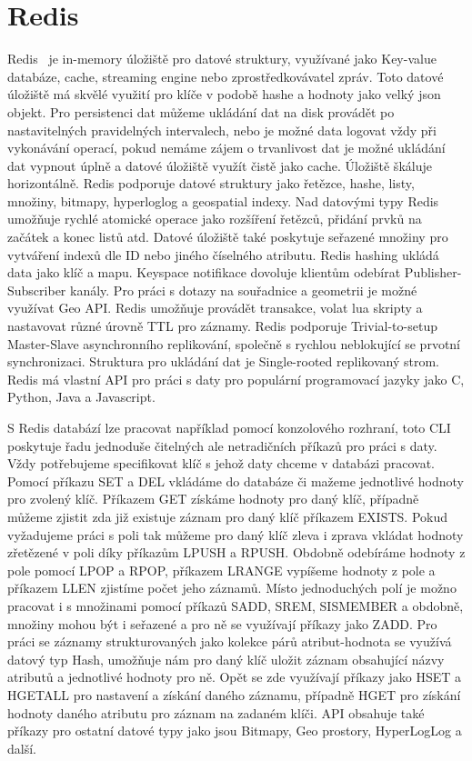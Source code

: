 \documentclass[czech,master,dept460,male,csharp,cpdeclaration]{diploma}
\begin{document}
	\section{Redis}
	
	Redis~\cite{redis} je in-memory úložiště pro datové struktury, využívané jako Key-value databáze, cache, streaming engine nebo zprostředkovávatel zpráv. Toto datové úložiště má skvělé využití pro klíče v podobě hashe a hodnoty jako velký json objekt. Pro persistenci dat můžeme ukládání dat na disk provádět po nastavitelných pravidelných intervalech, nebo je možné data logovat vždy při vykonávání operací, pokud nemáme zájem o trvanlivost dat je možné ukládání dat vypnout úplně a datové úložiště využít čistě jako cache. Úložiště škáluje horizontálně. Redis podporuje datové struktury jako řetězce, hashe, listy, množiny, bitmapy, hyperloglog a geospatial indexy. Nad datovými typy Redis umožňuje rychlé atomické operace jako rozšíření řetězců, přidání prvků na začátek a konec listů atd. Datové úložiště také poskytuje seřazené množiny pro vytváření indexů dle ID nebo jiného číselného atributu. Redis hashing ukládá data jako klíč a mapu. Keyspace notifikace dovoluje klientům odebírat Publisher-Subscriber kanály. Pro práci s dotazy na souřadnice a geometrii je možné využívat Geo API. Redis umožňuje provádět transakce, volat lua skripty a nastavovat různé úrovně TTL pro záznamy. Redis podporuje Trivial-to-setup Master-Slave asynchronního replikování, společně s rychlou neblokující se prvotní synchronizaci. Struktura pro ukládání dat je Single-rooted replikovaný strom. Redis má vlastní API pro práci s daty pro populární programovací jazyky jako C, Python, Java a Javascript.
	
	S Redis databází lze pracovat například pomocí konzolového rozhraní, toto CLI~\cite{rediscli} poskytuje řadu jednoduše čitelných ale netradičních příkazů pro práci s daty. Vždy potřebujeme specifikovat klíč s jehož daty chceme v databázi pracovat. Pomocí příkazu SET a DEL vkládáme  do databáze či mažeme jednotlivé hodnoty pro zvolený klíč. Příkazem GET získáme hodnoty pro daný klíč, případně můžeme zjistit zda již existuje záznam pro daný klíč příkazem EXISTS. Pokud vyžadujeme práci s poli tak můžeme pro daný klíč zleva i zprava vkládat hodnoty zřetězené v poli díky příkazům LPUSH a RPUSH. Obdobně odebíráme hodnoty z pole pomocí LPOP a RPOP, příkazem LRANGE vypíšeme hodnoty z pole a příkazem LLEN zjistíme počet jeho záznamů. Místo jednoduchých polí je možno pracovat i s množinami pomocí příkazů SADD, SREM, SISMEMBER a obdobně, množiny mohou být i seřazené a pro ně se využívají příkazy jako ZADD. Pro práci se záznamy strukturovaných jako kolekce párů atribut-hodnota se využívá datový typ Hash, umožňuje nám pro daný klíč uložit záznam obsahující názvy atributů a jednotlivé hodnoty pro ně. Opět se zde využívají příkazy jako HSET a HGETALL pro nastavení a získání daného záznamu, případně HGET pro získání hodnoty daného atributu pro záznam na zadaném klíči. API obsahuje také příkazy pro ostatní datové typy jako jsou Bitmapy, Geo prostory, HyperLogLog a další.
	
\end{document}
